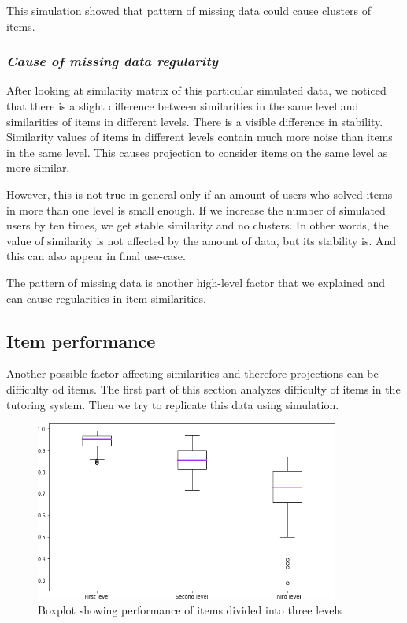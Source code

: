 \documentclass[
  printed, %
  table,   %
  nolof,     %
  nolot,     %
  color,
  final,
  nocover
]{fithesis3}
\begin{document}
This simulation showed that pattern of missing data could cause clusters of items.


\subsubsection{\textit{Cause of missing data regularity}}\label{cause-of-missing-data-regularity}

After looking at similarity matrix of this particular simulated data, we noticed that there is a slight difference between similarities in the same level and similarities of items in different levels. There is a visible difference in stability. Similarity values of items in different levels contain much more noise than items in the same level. This causes projection to consider items on the same level as more similar.

However, this is not true in general only if an amount of users who solved items in more than one level is small enough. If we increase the number of simulated users by ten times, we get stable similarity and no clusters. In other words, the value of similarity is not affected by the amount of data, but its stability is. And this can also appear in final use-case.

The pattern of missing data is another high-level factor that we explained and can cause regularities in item similarities.


\subsection{Item performance}\label{item-performance}

Another possible factor affecting similarities and therefore projections can be difficulty od items. The first part of this section analyzes difficulty of items in the tutoring system. Then we try to replicate this data using simulation.

\begin{figure}
  \includegraphics[width=10cm]{img/items_performance_levels}
  \caption{Boxplot showing performance of items divided into three levels}
  \label{fig:item_performance_levels}
\end{figure}
\end{document}

